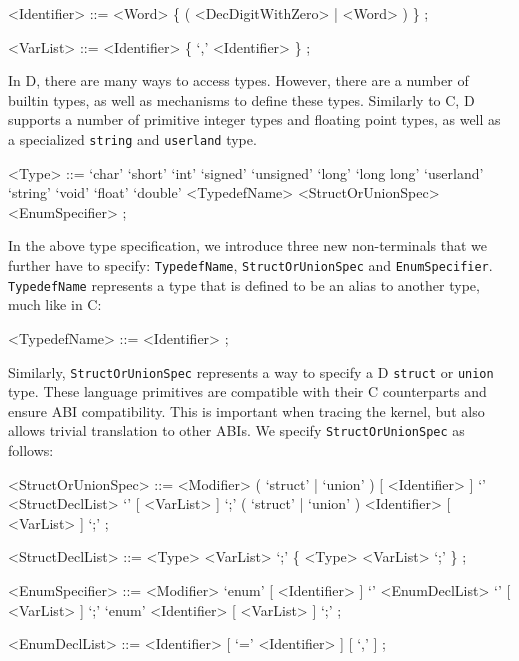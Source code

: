 \begin{grammar}
<Identifier> ::= <Word> \{ ( <DecDigitWithZero> | <Word> ) \} ;

<VarList> ::= <Identifier> \{ `,' <Identifier> \} ;
\end{grammar}

\noindent
In D, there are many ways to access types. However, there are a number of
builtin types, as well as mechanisms to define these types. Similarly to C, D
supports a number of primitive integer types and floating point types, as well
as a specialized \texttt{string} and \texttt{userland} type.

\begin{grammar}
<Type> ::= `char'
	\alt `short'
	\alt `int'
	\alt `signed'
	\alt `unsigned'
	\alt `long'
	\alt `long long'
	\alt `userland'
	\alt `string'
	\alt `void'
	\alt `float'
	\alt `double'
	\alt <TypedefName>
	\alt <StructOrUnionSpec>
	\alt <EnumSpecifier> ;
\end{grammar}

\noindent
In the above type specification, we introduce three new non-terminals that we
further have to specify: \texttt{TypedefName}, \texttt{StructOrUnionSpec} and
\texttt{EnumSpecifier}.  \texttt{TypedefName} represents a type that is defined
to be an alias to another type, much like in C:

\begin{grammar}
<TypedefName> ::= <Identifier> ;
\end{grammar}

\noindent
Similarly, \texttt{StructOrUnionSpec} represents a way to specify a D
\texttt{struct} or \texttt{union} type. These language primitives are compatible
with their C counterparts and ensure ABI compatibility. This is important when
tracing the kernel, but also allows trivial translation to other ABIs.  We
specify \texttt{StructOrUnionSpec} as follows:

\begin{grammar}
<StructOrUnionSpec> ::= <Modifier> ( `struct' | `union' ) [ <Identifier> ] \newline
	`{' <StructDeclList> `}' [ <VarList> ] `;'
	\alt ( `struct' | `union' ) <Identifier> [ <VarList> ] `;' ;

<StructDeclList> ::= <Type> <VarList> `;' \{ <Type> <VarList> `;' \} ;

<EnumSpecifier> ::= <Modifier> `enum' [ <Identifier> ] \newline
	`{' <EnumDeclList> `}' [ <VarList> ] `;'
	\alt `enum' <Identifier> [ <VarList> ] `;' ;

<EnumDeclList> ::= <Identifier> [ `=' <Identifier> ] [ `,' ] ;
\end{grammar}

